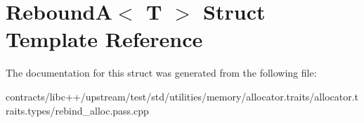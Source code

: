 \hypertarget{struct_rebound_a}{}\section{ReboundA$<$ T $>$ Struct Template Reference}
\label{struct_rebound_a}


The documentation for this struct was generated from the following file\+:\begin{DoxyCompactItemize}
\item 
contracts/libc++/upstream/test/std/utilities/memory/allocator.\+traits/allocator.\+traits.\+types/rebind\+\_\+alloc.\+pass.\+cpp\end{DoxyCompactItemize}
